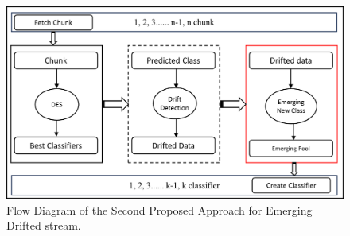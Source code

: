\begin{figure}[ht]
	\centering
	\includegraphics[width=1\linewidth]{5_Emerging/images/pro1.png}
	\caption{Flow Diagram of the Second Proposed Approach for Emerging Drifted
	stream.}
	\label{fig:proposal_step_1}
\end{figure}

